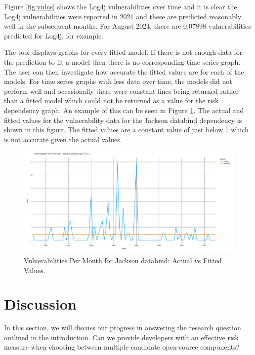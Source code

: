 \documentclass[conference]{IEEEtran}
\begin{document}
Figure \ref{fig:vulns} shows the Log4j vulnerabilities over time and it is clear the Log4j vulnerabilities were reported in 2021 and these are predicted reasonably well in the subsequent months. For August 2024, there are 0.07898 vulnerabilities predicted for Log4j, for example.

The tool displays graphs for every fitted model. If there is not enough data for the prediction to fit a model then there is no corresponding time series graph. The user can then investigate how accurate the fitted values are for each of the models. For time series graphs with less data over time, the models did not perform well and occasionally there were constant lines being returned rather than a fitted model which could not be returned as a value for the risk dependency graph. An example of this can be seen in Figure \ref{fig:const}. The actual and fitted values for the vulnerability data for the Jackson databind dependency \cite{noauthor_fasterxmljackson-databind_2024} is shown in this figure. The fitted values are a constant value of just below 1 which is not accurate given the actual values. 

\begin{figure}
    \centering
    \includegraphics[width=1\linewidth]{Const.png}
    \caption{Vulnerabilities Per Month for Jackson databind: Actual vs Fitted Values.} 
    \label{fig:const}
\end{figure}

\section{Discussion}
In this section, we will discuss our progress in answering the research question outlined in the introduction. Can we provide developers with an effective risk measure when choosing between multiple candidate open-source components?
\end{document}
